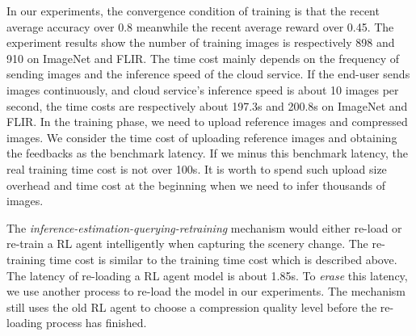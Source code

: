 \textcolor{revise}{In our experiments, the convergence condition of training is that the recent average accuracy over 0.8 meanwhile the recent average reward over 0.45. The experiment results show the number of training images is respectively 898 and 910 on ImageNet and FLIR. The time cost mainly depends on the frequency of sending images and the inference speed of the cloud service. If the end-user sends images continuously, and cloud service's inference speed is about 10 images per second, the time costs are respectively about 197.3s and 200.8s on ImageNet and FLIR. In the training phase, we need to upload reference images and compressed images. We consider the time cost of uploading reference images and obtaining the feedbacks as the benchmark latency. If we minus this benchmark latency, the real training time cost is not over 100s. It is worth to spend such upload size overhead and time cost at the beginning when we need to infer thousands of images.}   


\textcolor{revise}{The \emph{inference-estimation-querying-retraining} mechanism would either re-load or re-train a RL agent intelligently when capturing the scenery change. The re-training time cost is similar to the training time cost which is described above. The latency of re-loading a RL agent model is about 1.85s. To \emph{erase} this latency, we use another process to re-load the model in our experiments. The mechanism still uses the old RL agent to choose a compression quality level before the re-loading process has finished.}
